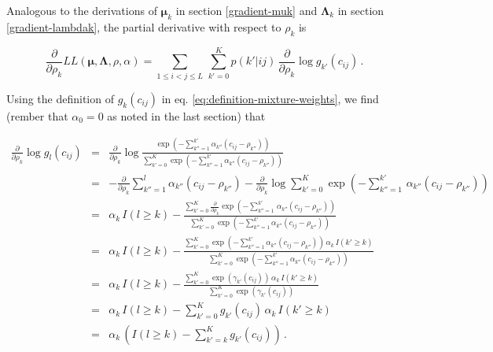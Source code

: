 \documentclass[11pt,a4paper,twoside]{book}
\newcommand{\eq}{\!=\!}
\newcommand{\Lk}{\mathbf{\Lambda}_k}
\newcommand{\muk}{\mathbf{\mu}_k}
\newcommand{\cij}{c_{ij}}
\theoremstyle{definition}
\theoremstyle{definition}
\theoremstyle{remark}
\begin{document}
Analogous to the derivations of \(\muk\) in section \ref{gradient-muk}
and \(\Lk\) in section \ref{gradient-lambdak}, the partial derivative
with respect to \(\rho_k\) is

\begin{equation}
\frac{\partial} {\partial \rho_k} L\!L(\mathbf{\mu}, \mathbf{\Lambda}, \rho, \alpha) =  \sum_{1\le i<j\le L}  \, \sum_{k'=0}^K  p(k'|ij) \,  \frac{\partial} {\partial \rho_k}  \log g_{k'}(\cij)  \,.
    \label{eq:nabla-rhok-LL-pre}
\end{equation}

Using the definition of \(g_k(\cij)\) in eq.
\eqref{eq:definition-mixture-weights}, we find (rember that
\(\alpha_0 \eq 0\) as noted in the last section) that

\begin{eqnarray}
    \frac{\partial} {\partial \rho_k}  \log g_{l}(\cij)  
    &=& \frac{\partial} {\partial \rho_k}  \log  \frac{\exp \left(- \sum_{k''=1}^{k'} \alpha_{k''} (\cij - \rho_{k''} ) \right) }{ \sum_{k'=0}^K  \exp \left(- \sum_{k''=1}^{k'} \alpha_{k''} (\cij - \rho_{k''} ) \right) } \nonumber \\
    &=& -  \frac{\partial} {\partial \rho_k}  \sum_{k''=1}^{l} \alpha_{k''} (\cij - \rho_{k''} )  
        - \frac{\partial} {\partial \rho_k}  \log  \sum_{k'=0}^K  \exp \left(- \sum_{k''=1}^{k'} \, \alpha_{k''} (\cij - \rho_{k''} ) \right)  \nonumber \\
    &=& \alpha_k \, I(l \ge k)   
        -  \frac{ \sum_{k'=0}^K \frac{\partial} {\partial \rho_k}  \exp (- \sum_{k''=1}^{k'} \, \alpha_{k''} (\cij - \rho_{k''} ) ) }{ \sum_{k'=0}^K  \exp (- \sum_{k''=1}^{k'} \alpha_{k''} (\cij - \rho_{k''} ) ) } \nonumber \\
    &=& \alpha_k \, I(l \ge k)   
        -  \frac{ \sum_{k'=0}^K \exp (- \sum_{k''=1}^{k'} \alpha_{k''} (\cij - \rho_{k''} ) ) \, \alpha_k \, I(k' \ge k)    }{ \sum_{k'=0}^K  \exp (- \sum_{k''=1}^{k'} \alpha_{k''} (\cij - \rho_{k''} ) ) } \nonumber \\
    &=& \alpha_k \, I(l \ge k)   
        -  \frac{ \sum_{k'=0}^K \exp (\gamma_{k'}(\cij) ) \, \alpha_k \, I(k' \ge k)    }{ \sum_{k'=0}^K  \exp (\gamma_{k'}(\cij) ) } \nonumber \\
    &=& \alpha_k \, I(l \ge k)   
        -  \sum_{k'=0}^K  g_{k'}(\cij) \, \alpha_k \, I(k' \ge k)  \nonumber \\ 
    &=& \alpha_k \, \left(  I(l \ge k)  -  \sum_{k'=k}^K  g_{k'}(\cij) \right)  \, .
    \label{eq:dlog-gk-drho}
\end{eqnarray}
\end{document}
